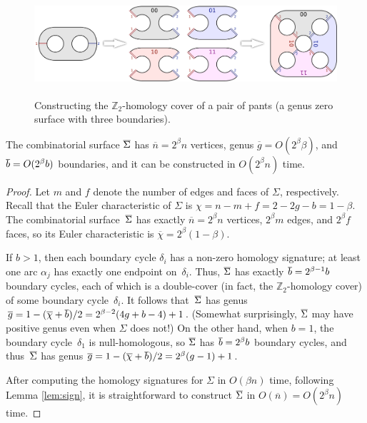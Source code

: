\documentclass[letterpaper,review]{siamart190516}
\def\Z{\mathbb{Z}}
\def\dualarc{\alpha}
\def\Sigmabar{\overline{\smash{\Sigma}\vphantom{t}}}
\def\bbar{\overline{\smash{b}\vphantom{t}}}
\def\nbar{\overline{n}}
\def\gbar{\overline{g}}
\def\chibar{\overline{\chi}}
\begin{document}
\begin{figure}
\centering
\includegraphics[height=1.5in]{Fig/hom-cover-example}
\caption{Constructing the $\Z_2$-homology cover of a pair of pants (a genus zero surface with three boundaries).}
\label{fig:cover-ex}
\end{figure}

\begin{lemma}
\label{lem:cover-cxy}
The combinatorial surface $\Sigmabar$ has $\nbar = 2^\beta n$ vertices, genus $\gbar = O(2^\beta \beta)$, and $\bbar = O(2^\beta b)$ boundaries, and it can be constructed in $O(2^\beta n)$ time.
\end{lemma}

\begin{proof}
Let $m$ and $f$ denote the number of edges and faces of $\Sigma$, respectively.  Recall that the Euler characteristic of $\Sigma$ is $\chi = n - m + f = 2 - 2g - b = 1-\beta$.  The combinatorial surface~$\Sigmabar$ has exactly $\nbar = 2^\beta n$ vertices, $2^\beta m$ edges, and $2^\beta f$ faces, so its Euler characteristic is $\chibar = 2^\beta (1-\beta)$.

If $b>1$, then each boundary cycle $\delta_i$ has a non-zero homology signature; at least one arc $\dualarc_j$ has exactly one endpoint on~$\delta_i$.  Thus, $\Sigmabar$ has exactly $\bbar = 2^{\beta-1} b$ boundary cycles, each of which is a double-cover (in fact, the $\Z_2$-homology cover) of some boundary cycle~$\delta_i$.  It follows that~$\Sigmabar$ has genus $\gbar = 1-(\chibar+\bbar)/2 = {2^{\beta-2} ({4g+b-4}) + 1}$.  (Somewhat surprisingly, $\Sigmabar$ may have positive genus even when $\Sigma$ does not!)  On the other hand, when $b=1$, the boundary cycle~$\delta_1$ is null-homologous, so $\Sigmabar$ has $\bbar = 2^\beta b$ boundary cycles, and thus~$\Sigmabar$ has genus $\gbar = {1-(\chibar+\bbar)/2} =  {2^\beta (g-1) + 1}$.

After computing the homology signatures for $\Sigma$ in $O(\beta n)$ time, following Lemma \ref{lem:sign}, it is straightforward to construct $\Sigmabar$ in $O(\nbar) = O(2^\beta n)$ time.
\end{proof}
\end{document}
